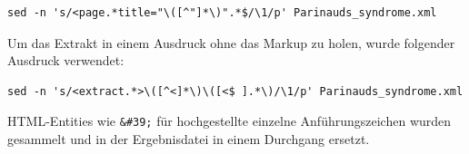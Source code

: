 \documentclass[pagesize,DIV=calc,12pt,final]{scrreprt}
\begin{document}
\lstset{
language=bash
}

\begin{lstlisting}
sed -n 's/<page.*title="\([^"]*\)".*$/\1/p' Parinauds_syndrome.xml
\end{lstlisting}

Um das Extrakt in einem Ausdruck ohne das Markup zu holen, wurde
folgender Ausdruck verwendet:

\begin{lstlisting}
sed -n 's/<extract.*>\([^<]*\)\([<$ ].*\)/\1/p' Parinauds_syndrome.xml
\end{lstlisting}

HTML-Entities wie \texttt{\&\#39;} für hochgestellte einzelne Anführungszeichen wurden gesammelt und in der Ergebnisdatei in einem Durchgang ersetzt.
\end{document}
